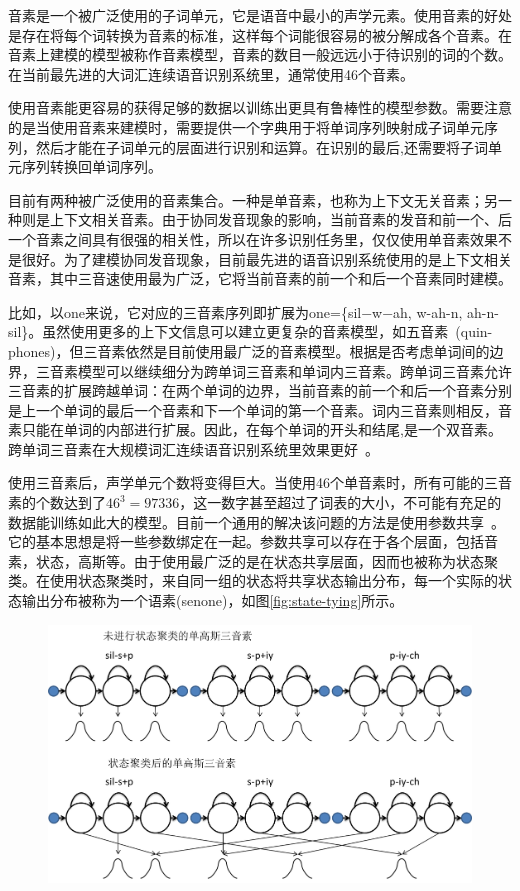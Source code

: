 音素是一个被广泛使用的子词单元，它是语音中最小的声学元素。使用音素的好处是存在将每个词转换为音素的标准，这样每个词能很容易的被分解成各个音素。在音素上建模的模型被称作音素模型，音素的数目一般远远小于待识别的词的个数。在当前最先进的大词汇连续语音识别系统里，通常使用46个音素。

使用音素能更容易的获得足够的数据以训练出更具有鲁棒性的模型参数。需要注意的是当使用音素来建模时，需要提供一个字典用于将单词序列映射成子词单元序列，然后才能在子词单元的层面进行识别和运算。在识别的最后,还需要将子词单元序列转换回单词序列。

目前有两种被广泛使用的音素集合。一种是单音素，也称为上下文无关音素；另一种则是上下文相关音素。由于协同发音现象的影响，当前音素的发音和前一个、后一个音素之间具有很强的相关性，所以在许多识别任务里，仅仅使用单音素效果不是很好。为了建模协同发音现象，目前最先进的语音识别系统使用的是上下文相关音素，其中三音速使用最为广泛，它将当前音素的前一个和后一个音素同时建模。

比如，以one来说，它对应的三音素序列即扩展为one=\{sil−w−ah, w-ah-n, ah-n-sil\}。虽然使用更多的上下文信息可以建立更复杂的音素模型，如五音素~\cite{hain2005automatic}(quin-phones)，但三音素依然是目前使用最广泛的音素模型。根据是否考虑单词间的边界，三音素模型可以继续细分为跨单词三音素和单词内三音素。跨单词三音素允许三音素的扩展跨越单词：在两个单词的边界，当前音素的前一个和后一个音素分别是上一个单词的最后一个音素和下一个单词的第一个音素。词内三音素则相反，音素只能在单词的内部进行扩展。因此，在每个单词的开头和结尾,是一个双音素。跨单词三音素在大规模词汇连续语音识别系统里效果更好~\cite{woodland1994large}。

使用三音素后，声学单元个数将变得巨大。当使用46个单音素时，所有可能的三音素的个数达到了$46^3=97336$，这一数字甚至超过了词表的大小，不可能有充足的数据能训练如此大的模型。目前一个通用的解决该问题的方法是使用参数共享~\cite{young1993use, young1994tree}。它的基本思想是将一些参数绑定在一起。参数共享可以存在于各个层面，包括音素，状态，高斯等。由于使用最广泛的是在状态共享层面，因而也被称为状态聚类。在使用状态聚类时，来自同一组的状态将共享状态输出分布，每一个实际的状态输出分布被称为一个语素(senone)，如图\ref{fig:state-tying}所示。
\begin{figure}[!htp]
  \centering
    \captionstyle{\centering}
    \includegraphics[width=.8\textwidth]{figure/state.png}
\end{figure}

